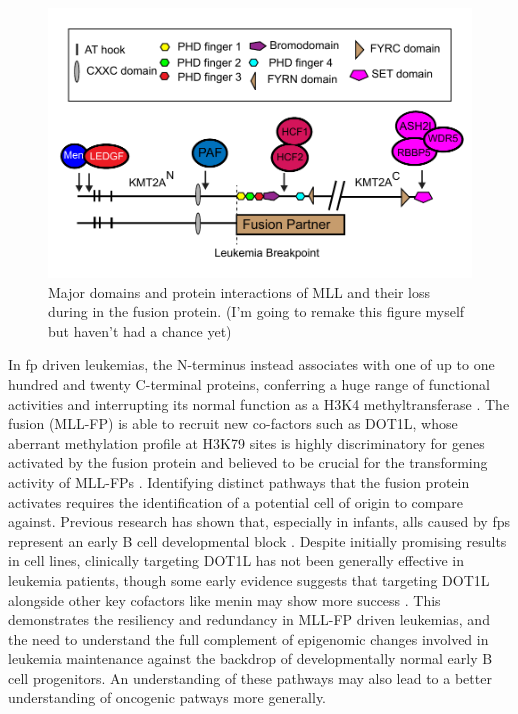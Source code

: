 \begin{figure}
    \centering
    \includegraphics[width=\textwidth]{plot/ch5/MLL schematic.pdf}
    \caption{Major domains and protein interactions of MLL and their loss during in the fusion protein. (I'm going to remake this figure myself but haven't had a chance yet)}
    \label{fig:mll_fig}
\end{figure}


In \gls{fp} driven leukemias, the N-terminus instead associates with one of up to one hundred and twenty C-terminal proteins, conferring a huge range of functional activities and interrupting its normal function as a H3K4 methyltransferase \cite{Hsieh2003}. 
The fusion (MLL-FP) is able to recruit new co-factors such as DOT1L, whose aberrant methylation profile at H3K79 sites is highly discriminatory for genes activated by the fusion protein and believed to be crucial for the transforming activity of MLL-FPs \cite{YOkada2005, KMBernt2011}.
Identifying distinct pathways that the fusion protein activates requires the identification of a potential cell of origin to compare against.
Previous research has shown that, especially in infants, \glspl{all} caused by \glspl{fp} represent an early B cell developmental block \cite{Rice2020a, Nahar2009}. 
Despite initially promising results in cell lines, clinically targeting DOT1L has not been generally effective in leukemia patients, though some early evidence suggests that targeting DOT1L alongside other key cofactors like menin may show more success \cite{Dafflon2016}. This demonstrates the resiliency and redundancy in MLL-FP driven leukemias, and the need to understand the full complement of epigenomic changes involved in leukemia maintenance against the backdrop of developmentally normal early B cell progenitors. An understanding of these pathways may also lead to a better understanding of oncogenic patways more generally.

